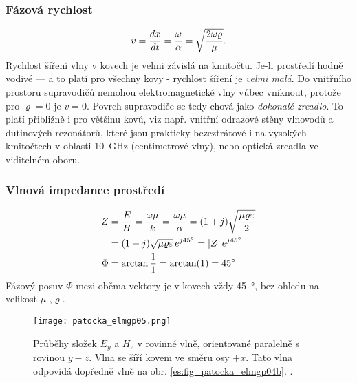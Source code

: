 {        \subsubsection{Fázová rychlost}
          \begin{equation}\label{ES:eq_elmagp51}
            v = \dfrac{d x}{d t} = \frac{\omega}{\alpha} 
              = \sqrt{\dfrac{2\omega\varrho}{\mu}}.
          \end{equation}
          Rychlost šíření vlny v kovech je velmi závislá na kmitočtu. Je-li prostředí hodně 
          vodivé — a to platí pro všechny kovy - rychlost šíření je \emph{velmi malá}. Do vnitřního 
          prostoru supravodičů nemohou elektromagnetické vlny vůbec vniknout, protože pro \(\varrho 
          = 0\) je \(v = 0\). Povrch supravodiče se tedy chová jako \emph{dokonalé zrcadlo}. To 
          platí přibližně i pro většinu kovů, viz např. vnitřní odrazové stěny vlnovodů a 
          dutinových rezonátorů, které jsou prakticky bezeztrátové i na vysokých kmitočtech v 
          oblasti \SI{10}{\GHz} (centimetrové vlny), nebo optická zrcadla ve viditelném oboru.

        \subsubsection{Vlnová impedance prostředí}
          \begin{subequations}
            \begin{align}
                Z &= \frac{E}{H} = \frac{\omega\mu}{k} 
                   = \frac{\omega\mu}{\alpha} 
                   = (1+j)\sqrt{\frac{\mu\varrho\varepsilon}{2}}                      \nonumber \\
                  &= (1+j)\sqrt{\mu\varrho\varepsilon}\,e^{j\SI{45}{\degree}}         
                   =  \left\lvert Z\right\rvert e^{j\SI{45}{\degree}}                      \label{ES:eq_elmagp51a} \\
             \Phi &= \arctan\frac{1}{1} 
                   = \arctan(1) 
                   = \SI{45}{\degree}                                   \label{ES:eq_elmagp51b} 
            \end{align}
          \end{subequations}
          Fázový posuv \(\Phi\) mezi oběma vektory je v kovech vždy \SI{45}{\degree}, bez ohledu na 
          velikost \(\mu\) ,\(\varrho\).
          
          \begin{figure}[ht!]
            \centering
            \texttt{[image: patocka\_elmgp05.png]}
            \caption{Průběhy složek \(E_y\) a \(H_z\) v rovinné vlně, orientované paralelně s 
                     rovinou \(y-z\). Vlna se šíří kovem ve směru osy \(+x\). Tato vlna odpovídá 
                     dopředně vlně na obr. \ref{es:fig_patocka_elmgp04b}. \cite[s.~80]{Patocka4}.}
            \label{ES:fig_elmgp05}
          \end{figure}
                
}
